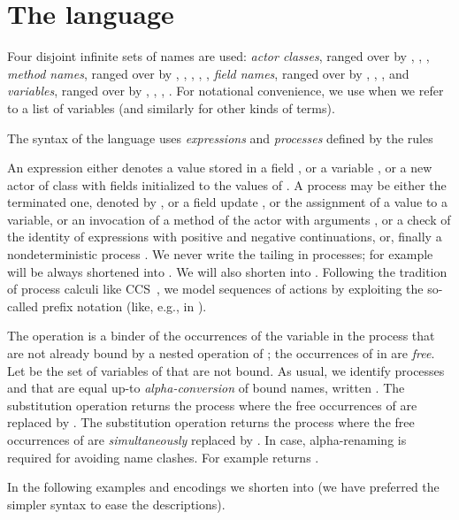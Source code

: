 \documentclass{LMCS}
\theoremstyle{plain}\newtheorem{proposition}[thm]{Proposition}
\theoremstyle{plain}\newtheorem{lemma}[thm]{Lemma}
\theoremstyle{plain}\newtheorem{theorem}[thm]{Theorem}
\theoremstyle{plain}\newtheorem{corollary}[thm]{Corollary}
\newcommand{\actor}{}
\begin{document}
\section{The language {\actor}}
\label{sec.thelanguage}
Four disjoint infinite sets of names are used:
\emph{actor classes}, ranged over by , , ,
\emph{method names}, ranged over by , , , , , 
\emph{field names}, ranged over by , , , 
and \emph{variables}, ranged over by , , , .
For notational convenience, we use  when we refer to a list of variables  (and similarly for other kinds of terms).


The syntax of the language {\actor} uses \emph{expressions}  and 
\emph{processes}  defined by the rules

An expression  either  denotes 
a value stored in a field , or a variable ,
or a new actor of class  with fields initialized to the values of
.
A process may be either the terminated one, denoted by , or a field update 
, or the assignment  of a value to a variable, or an invocation 
 of a method  of the actor 
with arguments , or a check  of the identity of 
expressions
with positive and negative continuations, or, finally  a nondeterministic process . 
We never write the tailing  in processes; for example 
 will be always shortened into .
We will also shorten  into .
Following the tradition of process calculi like CCS~\cite{Mil89},
we model sequences of actions by exploiting the 
so-called prefix notation (like, e.g., in ). 

The operation  is a binder of the occurrences of the
variable  in the process  that are not already bound by a nested
 operation of ; the occurrences of  in  are \emph{free}.
Let  be the set of variables of  that are not bound. 
As usual, we identify processes  and  that are equal up-to 
\emph{alpha-conversion} of bound names, written .
The 
substitution operation  returns the process  where the
free occurrences of  are replaced by . 
The 
substitution operation  returns the process  where the
free occurrences of  are \emph{simultaneously} replaced by . In case,
alpha-renaming is required for avoiding name clashes. For example 
 returns
.

In the following examples and
encodings we shorten  into 
 (we have preferred the simpler syntax to ease
the descriptions).
\end{document}
